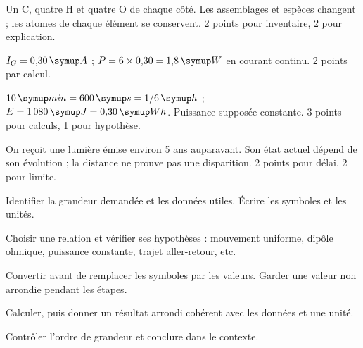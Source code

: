 \par\noindent\begin{minipage}{\linewidth}
Un C, quatre H et quatre O de chaque côté. Les assemblages et espèces changent ; les atomes de chaque élément se conservent. 2 points pour inventaire, 2 pour explication.\par
{}
\end{minipage}\par
\par\noindent\begin{minipage}{\linewidth}
$I_G=0{,}30\unite A$ ; $P=6\times0{,}30=1{,}8\unite W$ en courant continu. 2 points par calcul.\par
{}
\end{minipage}\par
\par\noindent\begin{minipage}{\linewidth}
$10\unite{min}=600\unite s=1/6\unite h$ ; $E=1\,080\unite J=0{,}30\unite{Wh}$. Puissance supposée constante. 3 points pour calculs, 1 pour hypothèse.\par
\end{minipage}\par
\par\noindent\begin{minipage}{\linewidth}
On reçoit une lumière émise environ 5 ans auparavant. Son état actuel dépend de son évolution ; la distance ne prouve pas une disparition. 2 points pour délai, 2 pour limite.\par
\end{minipage}\par
{}
\label{methodes}
\begin{questions}
\item Identifier la grandeur demandée et les données utiles. Écrire les symboles et les unités.
\item Choisir une relation et vérifier ses hypothèses : mouvement uniforme, dipôle ohmique, puissance constante, trajet aller-retour, etc.
\item Convertir avant de remplacer les symboles par les valeurs. Garder une valeur non arrondie pendant les étapes.
\item Calculer, puis donner un résultat arrondi cohérent avec les données et une unité.
\item Contrôler l’ordre de grandeur et conclure dans le contexte.
\end{questions}
